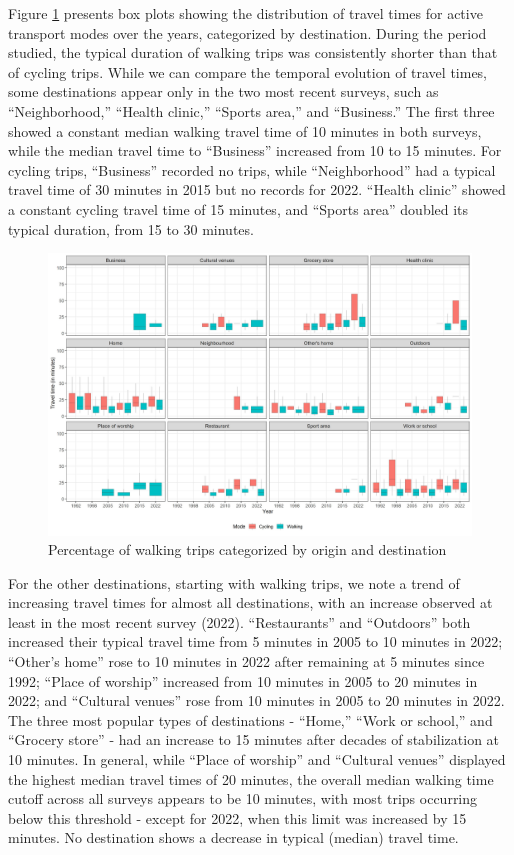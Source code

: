 \documentclass[preprint, 3p,
authoryear]{elsarticle} %
\begin{document}
Figure \ref{fig:figure-boxplot} presents box plots showing the
distribution of travel times for active transport modes over the years,
categorized by destination. During the period studied, the typical
duration of walking trips was consistently shorter than that of cycling
trips. While we can compare the temporal evolution of travel times, some
destinations appear only in the two most recent surveys, such as
``Neighborhood,'' ``Health clinic,'' ``Sports area,'' and ``Business.''
The first three showed a constant median walking travel time of 10
minutes in both surveys, while the median travel time to ``Business''
increased from 10 to 15 minutes. For cycling trips, ``Business''
recorded no trips, while ``Neighborhood'' had a typical travel time of
30 minutes in 2015 but no records for 2022. ``Health clinic'' showed a
constant cycling travel time of 15 minutes, and ``Sports area'' doubled
its typical duration, from 15 to 30 minutes.

\begin{figure}
\includegraphics[width=1\linewidth]{figures/destination_boxplots} \caption{Percentage of walking trips categorized by origin and destination}\label{fig:figure-boxplot}
\end{figure}

For the other destinations, starting with walking trips, we note a trend
of increasing travel times for almost all destinations, with an increase
observed at least in the most recent survey (2022). ``Restaurants'' and
``Outdoors'' both increased their typical travel time from 5 minutes in
2005 to 10 minutes in 2022; ``Other's home'' rose to 10 minutes in 2022
after remaining at 5 minutes since 1992; ``Place of worship'' increased
from 10 minutes in 2005 to 20 minutes in 2022; and ``Cultural venues''
rose from 10 minutes in 2005 to 20 minutes in 2022. The three most
popular types of destinations - ``Home,'' ``Work or school,'' and
``Grocery store'' - had an increase to 15 minutes after decades of
stabilization at 10 minutes. In general, while ``Place of worship'' and
``Cultural venues'' displayed the highest median travel times of 20
minutes, the overall median walking time cutoff across all surveys
appears to be 10 minutes, with most trips occurring below this threshold
- except for 2022, when this limit was increased by 15 minutes. No
destination shows a decrease in typical (median) travel time.
\end{document}
